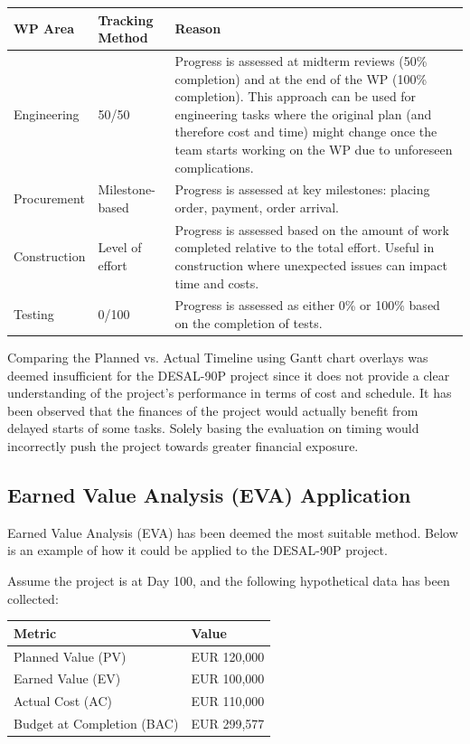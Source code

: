 \begin{table}[h]
\centering
\begin{tabular}{|p{10em}|p{10em}|p{20em}|}
\hline
\textbf{WP Area} & \textbf{Tracking Method} & \textbf{Reason} \\
\hline
Engineering & 50/50 & Progress is assessed at midterm reviews (50\% completion) and at the end of the WP (100\% completion). This approach can be used for engineering tasks where the original plan (and therefore cost and time) might change once the team starts working on the WP due to unforeseen complications. \\
\hline
Procurement & Milestone-based & Progress is assessed at key milestones: placing order, payment, order arrival. \\
\hline
Construction & Level of effort & Progress is assessed based on the amount of work completed relative to the total effort. Useful in construction where unexpected issues can impact time and costs. \\
\hline
Testing & 0/100 & Progress is assessed as either 0\% or 100\% based on the completion of tests. \\
\hline
\end{tabular}
\end{table}

Comparing the Planned vs. Actual Timeline using Gantt chart overlays was deemed insufficient for the DESAL-90P project since it does not provide a clear understanding of the project's performance in terms of cost and schedule. It has been observed that the finances of the project would actually benefit from delayed starts of some tasks. Solely basing the evaluation on timing would incorrectly push the project towards greater financial exposure.

\subsection*{Earned Value Analysis (EVA) Application}

Earned Value Analysis (EVA) has been deemed the most suitable method. Below is an example of how it could be applied to the DESAL-90P project.

Assume the project is at Day 100, and the following hypothetical data has been collected:

\begin{table}[h]
\centering
\begin{tabular}{|p{10em}|p{10em}|}
\hline
\textbf{Metric} & \textbf{Value} \\
\hline
Planned Value (PV) & EUR 120,000 \\
\hline
Earned Value (EV) & EUR 100,000 \\
\hline
Actual Cost (AC) & EUR 110,000 \\
\hline
Budget at Completion (BAC) & EUR 299,577 \\
\hline
\end{tabular}
\end{table}

